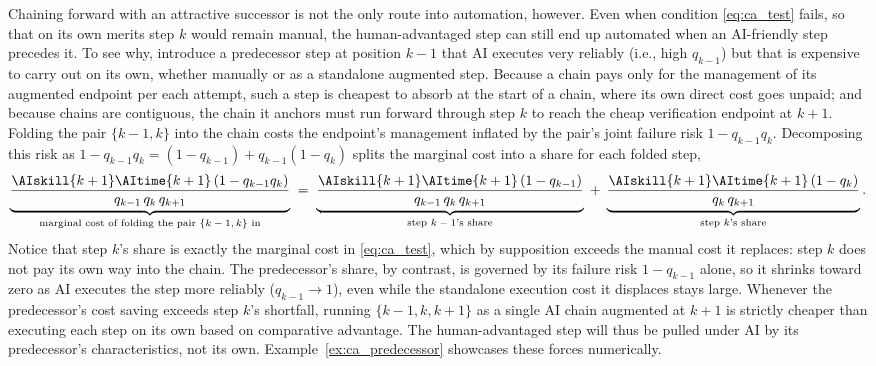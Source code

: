 Chaining forward with an attractive successor is not the only route into automation, however.
Even when condition \eqref{eq:ca_test} fails, so that on its own merits step $k$ would remain manual, the human-advantaged step can still end up automated when an AI-friendly step precedes it.
To see why, introduce a predecessor step at position $k-1$ that AI executes very reliably (i.e., high $q_{k-1}$) but that is expensive to carry out on its own, whether manually or as a standalone augmented step.
Because a chain pays only for the management of its augmented endpoint per each attempt, such a step is cheapest to absorb at the start of a chain, where its own direct cost goes unpaid; and because chains are contiguous, the chain it anchors must run forward through step $k$ to reach the cheap verification endpoint at $k+1$.
Folding the pair $\{k-1, k\}$ into the chain costs the endpoint's management inflated by the pair's joint failure risk $1 - q_{k-1}q_k$. 
Decomposing this risk as $1 - q_{k-1}q_k = (1-q_{k-1}) + q_{k-1}(1-q_k)$ splits the marginal cost into a share for each folded step,
\[
\underbrace{\frac{\AIskill{k+1}\AItime{k+1}\,(1-q_{k-1}q_k)}{q_{k-1}\,q_k\,q_{k+1}}}_{\text{marginal cost of folding the pair $\{k-1, k\}$ in}}
\;=\;
\underbrace{\frac{\AIskill{k+1}\AItime{k+1}\,(1-q_{k-1})}{q_{k-1}\,q_k\,q_{k+1}}}_{\text{step $k-1$'s share}}
\;+\;
\underbrace{\frac{\AIskill{k+1}\AItime{k+1}\,(1-q_k)}{q_k\,q_{k+1}}}_{\text{step $k$'s share}}.
\]
Notice that step $k$'s share is exactly the marginal cost in \eqref{eq:ca_test}, which by supposition exceeds the manual cost it replaces: step $k$ does not pay its own way into the chain.
The predecessor's share, by contrast, is governed by its failure risk $1 - q_{k-1}$ alone, so it shrinks toward zero as AI executes the step more reliably ($q_{k-1} \to 1$), even while the standalone execution cost it displaces stays large.
Whenever the predecessor's cost saving exceeds step $k$'s shortfall, running $\{k-1, k, k+1\}$ as a single AI chain augmented at $k+1$ is strictly cheaper than executing each step on its own based on comparative advantage. 
The human-advantaged step will thus be pulled under AI by its predecessor's characteristics, not its own.
Example~\ref{ex:ca_predecessor} showcases these forces numerically.

